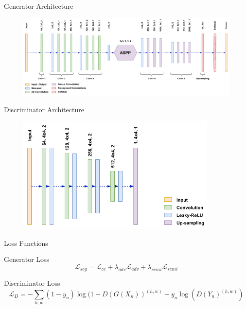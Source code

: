 \begin{frame}{Generator Architecture}
    \begin{figure}[!htb]
        \centering
        \includegraphics[width=14cm]{figures/method/generator_architecture}
    \end{figure}
\end{frame}


\begin{frame}{Discriminator Architecture}
    \begin{figure}[!htb]
        \centering
        \includegraphics[width=10cm]{figures/method/discriminator_architecture}
    \end{figure}
\end{frame}


\begin{frame}{Loss Functions}
    \begin{block}{Generator Loss}
        \begin{equation}
            \label{eq:seg_loss}
            \mathcal{L}_{seg} = \mathcal{L}_{ce} + \lambda_{adv}\mathcal{L}_{adv} + \lambda_{semi}\mathcal{L}_{semi}
        \end{equation}
    \end{block}
    \begin{block}{Discriminator Loss}
        \begin{equation}
            \label{eq:discriminator_loss}
            \mathcal{L}_{D} = -\sum_{h, w}(1-y_n)     \log(1-D(G(X_n))^{(h, w)} + y_n \log(D(Y_n)^{(h, w)})
        \end{equation}
    \end{block}
\end{frame}

